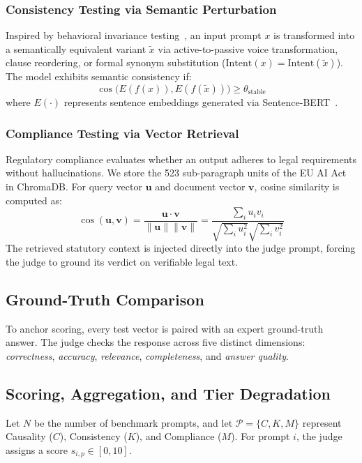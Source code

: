 \documentclass[conference]{IEEEtran}
\begin{document}
\subsubsection{Consistency Testing via Semantic Perturbation}
Inspired by behavioral invariance testing~\cite{ribeiro2020checklist}, an input prompt $x$ is transformed into a semantically equivalent variant $\tilde{x}$ via active-to-passive voice transformation, clause reordering, or formal synonym substitution ($\text{Intent}(x) = \text{Intent}(\tilde{x})$). The model exhibits semantic consistency if:
\begin{equation}
    \cos\big(E(f(x)), E(f(\tilde{x}))\big) \ge \theta_{\text{stable}}
    \label{eq:consistency}
\end{equation}
where $E(\cdot)$ represents sentence embeddings generated via Sentence-BERT~\cite{reimers2019sentence}.

\subsubsection{Compliance Testing via Vector Retrieval}
Regulatory compliance evaluates whether an output adheres to legal requirements without hallucinations. We store the 523 sub-paragraph units of the EU AI Act in ChromaDB. For query vector $\mathbf{u}$ and document vector $\mathbf{v}$, cosine similarity is computed as:
\begin{equation}
    \cos(\mathbf{u}, \mathbf{v}) = \frac{\mathbf{u} \cdot \mathbf{v}}{\|\mathbf{u}\| \|\mathbf{v}\|} = \frac{\sum_i u_i v_i}{\sqrt{\sum_i u_i^2} \sqrt{\sum_i v_i^2}}
    \label{eq:cosine_sim}
\end{equation}
The retrieved statutory context is injected directly into the judge prompt, forcing the judge to ground its verdict on verifiable legal text.

\subsection{Ground-Truth Comparison}
To anchor scoring, every test vector is paired with an expert ground-truth answer. The judge checks the response across five distinct dimensions: \emph{correctness}, \emph{accuracy}, \emph{relevance}, \emph{completeness}, and \emph{answer quality}.

\subsection{Scoring, Aggregation, and Tier Degradation}
Let $N$ be the number of benchmark prompts, and let $\mathcal{P} = \{C, K, M\}$ represent Causality ($C$), Consistency ($K$), and Compliance ($M$). For prompt $i$, the judge assigns a score $s_{i,p} \in [0, 10]$.
\end{document}
